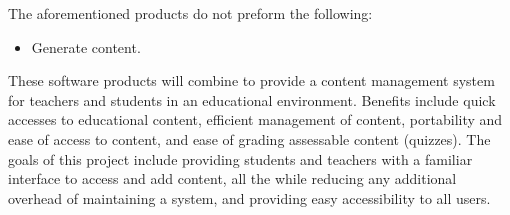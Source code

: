 \documentclass[]{article}
\begin{document}
\noindent The aforementioned products do not preform the following:
\begin{itemize}
  \item Generate content.
\end{itemize}

\noindent These software products will combine to provide a content management
system for teachers and students in an educational environment. Benefits include quick
accesses to educational content, efficient management of content, portability
and ease of access to content, and ease of grading assessable content
(quizzes). The goals of this project include providing students and teachers with a familiar
interface to access and add content, all the while reducing any additional
overhead of maintaining a system, and providing easy accessibility to all
users.
\end{document}
